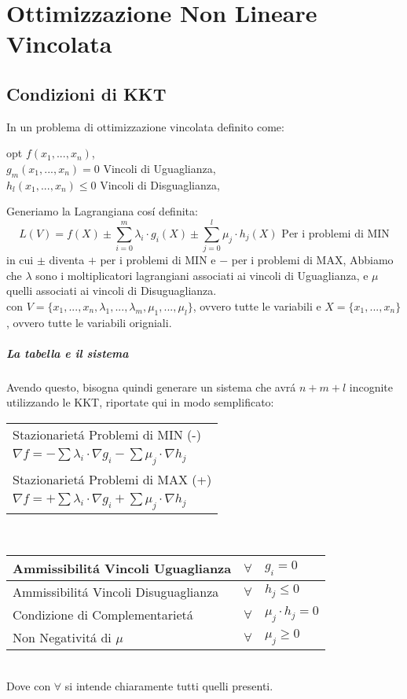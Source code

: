 \documentclass[12pt, a4paper, openany]{book}
\begin{document}
\chapter{Ottimizzazione Non Lineare Vincolata}
\section{Condizioni di KKT}
In un problema di ottimizzazione vincolata definito come:
\begin{center}
    opt $f(x_1,...,x_n)$,
    \\
    $g_m(x_1,...,x_n) = 0$ Vincoli di Uguaglianza,
    \\
    $h_l(x_1,...,x_n) \leq 0$ Vincoli di Disguaglianza,
\end{center}
Generiamo la Lagrangiana cosí definita:
\[
    L(V) = f(X) \pm \sum_{i=0}^{m} \lambda_i \cdot g_i(X) \pm \sum_{j=0}^{l} \mu_j \cdot h_j(X) \text{ Per i problemi di MIN}
\]
in cui $\pm$ diventa $+$ per i problemi di MIN e $-$ per i problemi di MAX, 
Abbiamo che $\lambda$ sono i moltiplicatori lagrangiani associati ai vincoli di Uguaglianza, e $\mu$ quelli associati ai vincoli di Disuguaglianza.
\\\small{con $V=\{x_1,...,x_n,\lambda_1,...,\lambda_m, \mu_1,...,\mu_l\}$, ovvero tutte le variabili e $X=\{x_1,...,x_n\}$, ovvero tutte le variabili origniali.}

\paragraph{La tabella e il sistema}
Avendo questo, bisogna quindi generare un sistema che avrá $n+m+l$ incognite utilizzando le KKT,
riportate qui in modo semplificato:\\
\begin{tabularx}{\textwidth}{|Y|}
    \hline
    Stazionarietá Problemi di MIN (-)\\
        $ \nabla f = - \sum \lambda_i \cdot \nabla g_i - \sum \mu_j \cdot \nabla h_j$ \\
    \hline \hline
    Stazionarietá Problemi di MAX (+)\\
        $ \nabla f = + \sum \lambda_i \cdot \nabla g_i + \sum \mu_j \cdot \nabla h_j$ \\
    \hline
\end{tabularx}\\
\begin{tabularx}{\textwidth}{|l|cY|}
    \hline
    Ammissibilitá Vincoli Uguaglianza &  $\forall$ & $ g_i = 0$\\
    \hline
    Ammissibilitá Vincoli Disuguaglianza &  $ \forall$ & $ h_j\leq 0$\\
    \hline
    Condizione di Complementarietá & $\forall$ & $ \mu_j \cdot h_j = 0$ \\ 
    \hline
    Non Negativitá di $\mu$ &$\forall $ & $ \mu_j \geq 0$\\
    \hline   
\end{tabularx}
\\Dove con $\forall$ si intende chiaramente tutti quelli presenti.
\end{document}
